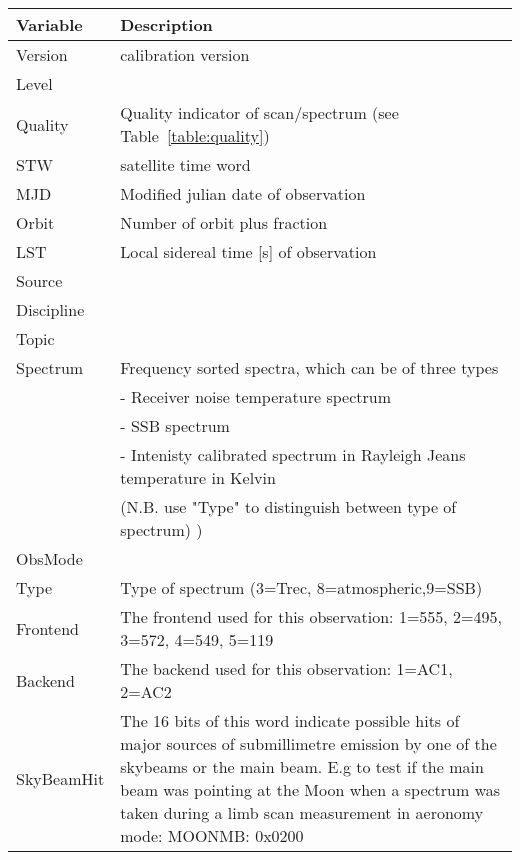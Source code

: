 \begin{longtable}{| p{} | p{} |} 
\hline
  \textbf{Variable} & \textbf{Description} \\
  \hline
     Version         & calibration version \\ \hline
     Level           & \\ \hline
     Quality         & Quality indicator of scan/spectrum (see Table~\ref{table:quality}) \\ \hline
     STW             & satellite time word\\ \hline
     MJD             & Modified julian date of observation \\ \hline
     Orbit           & Number of orbit plus fraction \\ \hline
     LST             & Local sidereal time [s] of observation \\ \hline
     Source          & \\ \hline
     Discipline      & \\ \hline
     Topic           & \\ \hline
     Spectrum        & Frequency sorted spectra, which can be of three types\\
                     & - Receiver noise temperature spectrum\\
                     & - SSB spectrum\\
                     & - Intenisty calibrated spectrum in Rayleigh Jeans temperature in Kelvin\\    
                     & (N.B. use "Type" to distinguish between type of spectrum) )\\ \hline
     ObsMode         & \\ \hline
     Type            & Type of spectrum (3=Trec, 8=atmospheric,9=SSB)\\ \hline
     Frontend        & The frontend used for this observation: 1=555, 2=495, 3=572, 4=549, 5=119\\ \hline
     Backend         & The backend used for this observation: 1=AC1, 2=AC2\\ \hline
     SkyBeamHit      & The 16 bits of this word indicate possible hits of major
                       sources of submillimetre emission by one of the skybeams or the
                       main beam. E.g to test if the main beam was pointing at the Moon
                       when a spectrum was taken during a limb scan measurement in aeronomy
                       mode:
                       MOONMB:  0x0200\\ \hline

\end{longtable}
